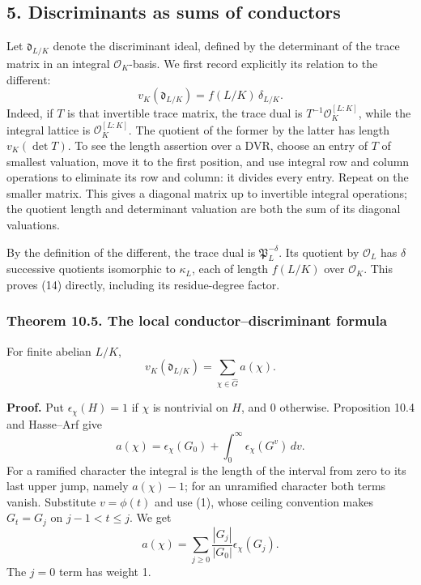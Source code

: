 \documentclass[11pt,a4paper]{article}
\begin{document}
\subsection{5. Discriminants as sums of
conductors}\label{discriminants-as-sums-of-conductors}

Let \(\mathfrak d_{L/K}\) denote the discriminant ideal, defined by the
determinant of the trace matrix in an integral \(\mathcal O_K\)-basis.
We first record explicitly its relation to the different: \[
v_K(\mathfrak d_{L/K})=f(L/K)\,\delta_{L/K}.
\tag{14}
\] Indeed, if \(T\) is that invertible trace matrix, the trace dual is
\(T^{-1}\mathcal O_K^{[L:K]}\), while the integral lattice is
\(\mathcal O_K^{[L:K]}\). The quotient of the former by the latter has
length \(v_K(\det T)\). To see the length assertion over a DVR, choose
an entry of \(T\) of smallest valuation, move it to the first position,
and use integral row and column operations to eliminate its row and
column: it divides every entry. Repeat on the smaller matrix. This gives
a diagonal matrix up to invertible integral operations; the quotient
length and determinant valuation are both the sum of its diagonal
valuations.

By the definition of the different, the trace dual is
\(\mathfrak P_L^{-\delta}\). Its quotient by \(\mathcal O_L\) has
\(\delta\) successive quotients isomorphic to \(\kappa_L\), each of
length \(f(L/K)\) over \(\mathcal O_K\). This proves (14) directly,
including its residue-degree factor.

\subsubsection{Theorem 10.5. The local conductor--discriminant
formula}\label{theorem-10.5.-the-local-conductordiscriminant-formula}

For finite abelian \(L/K\), \[
v_K(\mathfrak d_{L/K})=\sum_{\chi\in\widehat G}a(\chi).
\tag{15}
\]

\textbf{Proof.} Put \(\epsilon_\chi(H)=1\) if \(\chi\) is nontrivial on
\(H\), and 0 otherwise. Proposition 10.4 and Hasse--Arf give \[
a(\chi)=\epsilon_\chi(G_0)
           +\int_0^\infty\epsilon_\chi(G^v)\,dv.
\] For a ramified character the integral is the length of the interval
from zero to its last upper jump, namely \(a(\chi)-1\); for an
unramified character both terms vanish. Substitute \(v=\phi(t)\) and use
(1), whose ceiling convention makes \(G_t=G_j\) on \(j-1<t\leq j\). We
get \[
a(\chi)=\sum_{j\geq0}
          \frac{|G_j|}{|G_0|}\epsilon_\chi(G_j).
\tag{16}
\] The \(j=0\) term has weight 1.
\end{document}
